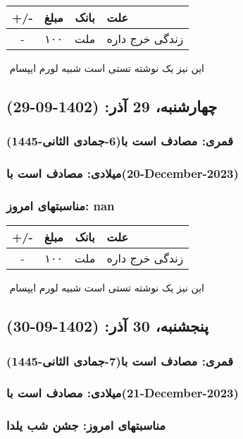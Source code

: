 \documentclass{article}
\newcommand{\rnote}[1]{\marginpar{\textcolor{color}{\StrSubstitute{\##1}{ }{\_}}}}
\newcommand{\myRow}[4]{
    #1 & #2 & #3 & #4 \\ \hline
}
\begin{document}
\begin{tabular}{ | c | c | c | p{5cm} |}
    \hline
    \myRow{ +/- }{مبلغ}{بانک}{علت}
    \myRow{-}{۱۰۰}{ملت}{زندگی خرج داره}
\end{tabular}
\newline
\newline

‌
\rnote{تست}
این نیز یک نوشته تستی است شبیه لورم ایپسام




\newpage
{}
\textcolor{color}{
\section{ چهارشنبه، 29 آذر: (1402-09-29) }
\subsubsection*{قمری: مصادف است با(6-جمادی الثانی-1445)} 
\subsubsection*{میلادی: مصادف است با(20-December-2023)}
\subsubsection*{مناسبتهای امروز: nan}
}


\begin{tabular}{ | c | c | c | p{5cm} |}
    \hline
    \myRow{ +/- }{مبلغ}{بانک}{علت}
    \myRow{-}{۱۰۰}{ملت}{زندگی خرج داره}
\end{tabular}
\newline
\newline

‌
\rnote{تست}
این نیز یک نوشته تستی است شبیه لورم ایپسام




\newpage
{}
\textcolor{color}{
\section{ پنجشنبه، 30 آذر: (1402-09-30) }
\subsubsection*{قمری: مصادف است با(7-جمادی الثانی-1445)} 
\subsubsection*{میلادی: مصادف است با(21-December-2023)}
\subsubsection*{مناسبتهای امروز: جشن شب یلدا}
}
\end{document}

